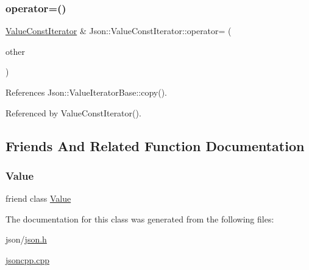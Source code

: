 \subsubsection{\texorpdfstring{operator=()}{operator=()}}
{\footnotesize\ttfamily \hyperlink{classJson_1_1ValueConstIterator}{Value\+Const\+Iterator} \& Json\+::\+Value\+Const\+Iterator\+::operator= (\begin{DoxyParamCaption}\item[{const \hyperlink{classJson_1_1ValueIteratorBase}{Value\+Iterator\+Base} \&}]{other }\end{DoxyParamCaption})}



References Json\+::\+Value\+Iterator\+Base\+::copy().



Referenced by Value\+Const\+Iterator().



\subsection{Friends And Related Function Documentation}
\mbox{\label{classJson_1_1ValueConstIterator_aeceedf6e1a7d48a588516ce2b1983d6f_aeceedf6e1a7d48a588516ce2b1983d6f}} 
\subsubsection{\texorpdfstring{Value}{Value}}
{\footnotesize\ttfamily friend class \hyperlink{classJson_1_1Value}{Value}\hspace{0.3cm}{\ttfamily [friend]}}



The documentation for this class was generated from the following files\+:\begin{DoxyCompactItemize}
\item 
json/\hyperlink{json_8h}{json.\+h}\item 
\hyperlink{jsoncpp_8cpp}{jsoncpp.\+cpp}\end{DoxyCompactItemize}
